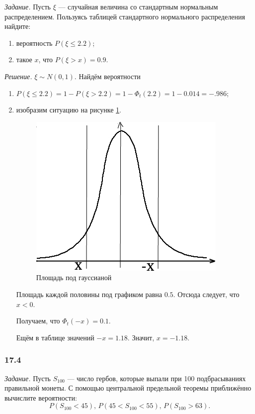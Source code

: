 \textit{Задание.} Пусть $ \xi $ --- случайная величина со стандартным нормальным распределением.
Пользуясь таблицей стандартного нормального распределения найдите:
\begin{enumerate}[label=\alph*)]
\item вероятность $P \left( \xi \leq 2.2 \right) $;
\item такое $x$, что $P \left( \xi > x \right) = 0.9$.
\end{enumerate}

\textit{Решение.} $ \xi \sim N \left( 0 ,1 \right) $.
Найдём вероятности
\begin{enumerate}[label=\alph*)]
\item $P \left( \xi \leq 2.2 \right) =
        1 -P \left( \xi > 2.2 \right) =
        1 - \Phi_t \left( 2.2 \right) =
        1 - 0.014 =
        -.986$;
\item изобразим ситуацию на рисунке \ref{fig:173}.

\begin{figure}[h!]
  \centering
  \includegraphics[width=.4\textwidth]{./pictures/17_3.png}
  \caption{Площадь под гауссианой}
  \label{fig:173}
\end{figure}

Площадь каждой половины под графиком равна $0.5$.
Отсюда следует, что $x < 0$.

Получаем, что $ \Phi_t \left( -x \right) = 0.1$.

Ещём в таблице значений $-x = 1.18$.
Значит, $x = -1.18$.
\end{enumerate}

\subsubsection*{17.4}

\textit{Задание.}
Пусть $S_{100}$ --- число гербов, которые выпали при 100 подбрасываниях правильной монеты.
С помощью центральной предельной теоремы приближённо вычислите вероятности:
$$P \left( S_{100} < 45 \right), \,
  P \left( 45 < S_{100} < 55 \right), \,
  P \left( S_{100} > 63 \right).$$

